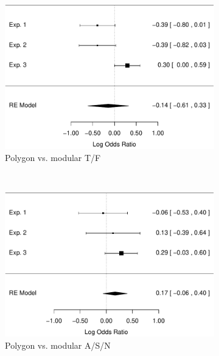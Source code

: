 \documentclass[man,mask,10pt]{apa6}
\begin{document}
\begin{figure}
\centering
\begin{subfigure}[c]{0.4\textwidth}
\centering
\includegraphics[width=\textwidth]{figures/meta/question_typegenerator_TF_n_conditionpolygon.pdf}
\caption{Polygon vs. modular T/F}
\end{subfigure}
~
\begin{subfigure}[c]{0.4\textwidth}
\centering
\includegraphics[width=\textwidth]{figures/meta/question_typegenerator_ASN_n_conditionpolygon.pdf}
\caption{Polygon vs. modular A/S/N}
\end{subfigure} \\
\centering
\begin{subfigure}[c]{0.4\textwidth}
\centering

\end{subfigure}
\end{figure}
\end{document}
